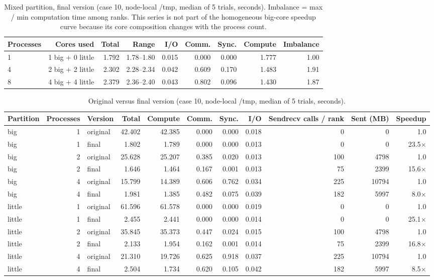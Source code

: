 \begin{table}[htbp]
\centering
\caption{Mixed partition, final version (case 10, node-local /tmp, median of 5 trials, seconds). Imbalance = max / min computation time among ranks. This series is not part of the homogeneous big-core speedup curve because its core composition changes with the process count.}
\label{tab:mixed}
\begin{tabular}{lrrrrrrrr}
\toprule
Processes & Cores used & Total & Range & I/O & Comm. & Sync. & Compute & Imbalance \\
\midrule
1 & 1 big + 0 little & 1.792 & 1.78--1.80 & 0.015 & 0.000 & 0.000 & 1.777 & 1.00 \\
4 & 2 big + 2 little & 2.302 & 2.28--2.34 & 0.042 & 0.609 & 0.170 & 1.483 & 1.91 \\
8 & 4 big + 4 little & 2.379 & 2.36--2.40 & 0.043 & 0.802 & 0.096 & 1.430 & 1.87 \\
\bottomrule
\end{tabular}
\end{table}

\begin{table}[htbp]
\centering
\caption{Original versus final version (case 10, node-local /tmp, median of 5 trials, seconds).}
\label{tab:ori-final}
\begin{tabular}{lrlrrrrrrrr}
\toprule
Partition & Processes & Version & Total & Compute & Comm. & Sync. & I/O & Sendrecv calls / rank & Sent (MB) & Speedup \\
\midrule
big & 1 & original & 42.402 & 42.385 & 0.000 & 0.000 & 0.018 & 0 & 0 & 1.0 \\
big & 1 & final & 1.802 & 1.789 & 0.000 & 0.000 & 0.013 & 0 & 0 & 23.5$\times$ \\
big & 2 & original & 25.628 & 25.207 & 0.385 & 0.020 & 0.013 & 100 & 4798 & 1.0 \\
big & 2 & final & 1.646 & 1.464 & 0.167 & 0.001 & 0.013 & 75 & 2399 & 15.6$\times$ \\
big & 4 & original & 15.799 & 14.389 & 0.606 & 0.762 & 0.034 & 225 & 10794 & 1.0 \\
big & 4 & final & 1.981 & 1.385 & 0.482 & 0.075 & 0.039 & 182 & 5997 & 8.0$\times$ \\
little & 1 & original & 61.596 & 61.578 & 0.000 & 0.000 & 0.019 & 0 & 0 & 1.0 \\
little & 1 & final & 2.455 & 2.441 & 0.000 & 0.000 & 0.014 & 0 & 0 & 25.1$\times$ \\
little & 2 & original & 35.845 & 35.373 & 0.447 & 0.024 & 0.015 & 100 & 4798 & 1.0 \\
little & 2 & final & 2.133 & 1.954 & 0.162 & 0.001 & 0.014 & 75 & 2399 & 16.8$\times$ \\
little & 4 & original & 21.310 & 19.726 & 0.625 & 0.918 & 0.037 & 225 & 10794 & 1.0 \\
little & 4 & final & 2.504 & 1.734 & 0.620 & 0.105 & 0.042 & 182 & 5997 & 8.5$\times$ \\
\bottomrule
\end{tabular}
\end{table}

